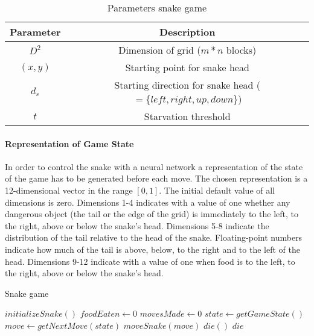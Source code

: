 \begin{table}[H]
  \centering
  \begin{center}
    \begin{tabular}{ | c | c | }
      \hline
      Parameter & Description \\ \hline
      $D^2$ & Dimension of grid ($m*n$ blocks) \\ \hline
      $(x,y)$ & Starting point for snake head \\ \hline
      $d_s$ & Starting direction for snake head ($=\{left,right,up,down\}$) \\ \hline
      $t$ & Starvation threshold \\ \hline
    \end{tabular}
  \end{center}
  \caption{Parameters snake game}
  \label{snake_p}
\end{table}


\paragraph{Representation of Game State}

In order to control the snake with a neural network a representation of the state of the game has to be generated before each move. The chosen representation is a 12-dimensional vector in the range $[0,1]$. The initial default value of all dimensions is zero. Dimensions 1-4 indicates with a value of one whether any dangerous object (the tail or the edge of the grid) is immediately to the left, to the right, above or below the snake's head. Dimensions 5-8 indicate the distribution of the tail relative to the head of the snake. Floating-point numbers indicate how much of the tail is above, below, to the right and to the left of the head. Dimensions 9-12 indicate with a value of one when food is to the left, to the right, above or below the snake's head.

\begin{algorithm}[h]

  \caption{Snake game}
  \label{snake_alg}
    \begin{algorithmic}
      \State $initializeSnake()$
      \State $foodEaten \gets 0$
      \State $movesMade \gets 0$
        \State $state \gets getGameState()$
        \State $move \gets getNextMove(state)$
        \State $moveSnake(move)$
         $die()$
        \EndIf
         $die$
        \EndIf
        \EndIf
      \EndWhile

    \end{algorithmic}
\end{algorithm}

